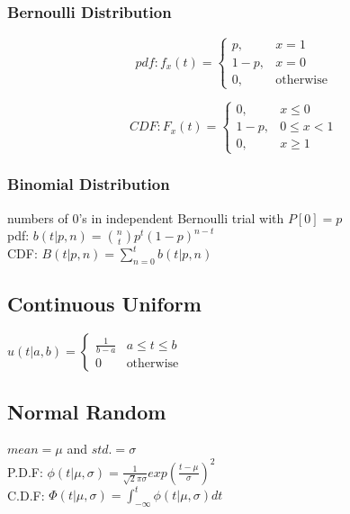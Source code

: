 \documentclass{article}
\begin{document}
{        \subsubsection{Bernoulli Distribution}{
            \[pdf: f_x(t)= \begin{cases} 
                p, & x = 1 \\ 
                1-p, & x = 0 \\
                0, & \text{otherwise}
            \end{cases}\]

            \[CDF: F_x(t)= \begin{cases} 
                0, & x \leqslant 0 \\ 
                1-p, & 0 \leqslant x < 1 \\
                0, & x \geqslant 1
            \end{cases}\]
        }
        \subsubsection{Binomial Distribution}{
            numbers of 0's in independent Bernoulli trial with $P[0]= p$
            \\pdf: $b(t| p, n)= {n \choose t}p^t (1-p)^{n-t}$
            \\CDF: $B(t| p, n)= \sum_{n=0}^t b(t| p, n)$
        }
    }	


	
\subsection{Continuous Uniform} 		
	$ u(t| a, b)= \begin{cases} \frac{1}{b-a}  & a \le t \le b \\ 
	0& \text{otherwise} \end{cases}$
	
            
\subsection{Normal Random}             
	$mean= \mu $ and $std.= \sigma $
	\\P.D.F: $\phi(t| \mu, \sigma)= \frac{1}{\sqrt{2} \pi \sigma }exp(\frac{t-\mu}{\sigma})^2$
	\\C.D.F: $\Phi(t| \mu, \sigma)=  \int_{-\infty}^{t} \phi(t| \mu, \sigma)dt$
        
\end{document}
